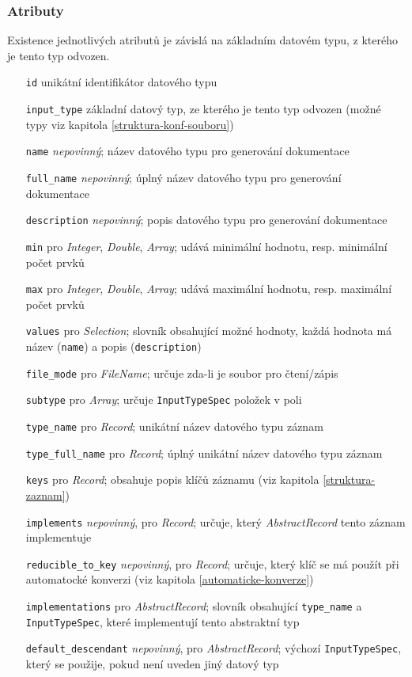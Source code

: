 \documentclass[FM,MP]{tulthesis}
\begin{document}
			\subsubsection{Atributy}
				Existence jednotlivých atributů je závislá na základním datovém typu, z kterého je tento typ odvozen.
				\begin{itemize}[leftmargin=4cm]
					\setlength\itemsep{-2mm}
					\item[\texttt{id}] unikátní identifikátor datového typu
					\item[\texttt{input\_type}] základní datový typ, ze kterého je tento typ odvozen (možné typy viz kapitola \ref{struktura-konf-souboru})
					\item[\texttt{name}] \textit{nepovinný}; název datového typu pro generování dokumentace
					\item[\texttt{full\_name}] \textit{nepovinný}; úplný název datového typu pro generování dokumentace
					\item[\texttt{description}] \textit{nepovinný}; popis datového typu pro generování dokumentace
					\item[\texttt{min}] pro \textit{Integer}, \textit{Double}, \textit{Array}; udává minimální hodnotu, resp. minimální počet prvků
					\item[\texttt{max}] pro \textit{Integer}, \textit{Double}, \textit{Array}; udává maximální hodnotu, resp. maximální počet prvků
					\item[\texttt{values}] pro \textit{Selection}; slovník obsahující možné hodnoty, každá hodnota má název (\texttt{name}) a popis (\texttt{description})
					\item[\texttt{file\_mode}] pro \textit{FileName}; určuje zda-li je soubor pro čtení/zápis
					\item[\texttt{subtype}] pro \textit{Array}; určuje \texttt{InputTypeSpec} položek v poli
					\item[\texttt{type\_name}] pro \textit{Record}; unikátní název datového typu záznam
					\item[\texttt{type\_full\_name}] pro \textit{Record}; úplný unikátní název datového typu záznam
					\item[\texttt{keys}] pro \textit{Record}; obsahuje popis klíčů záznamu (viz kapitola \ref{struktura-zaznam})
					\item[\texttt{implements}] \textit{nepovinný}, pro \textit{Record}; určuje, který \textit{AbstractRecord} tento záznam implementuje
					\item[\texttt{reducible\_to\_key}] \textit{nepovinný}, pro \textit{Record}; určuje, který klíč se má použít při automatocké konverzi (viz kapitola \ref{automaticke-konverze})
					\item[\texttt{implementations}] pro \textit{AbstractRecord}; slovník obsahující \texttt{type\_name} a \texttt{InputTypeSpec}, které implementují tento abstraktní typ
					\item[\texttt{default\_descendant}] \textit{nepovinný}, pro \textit{AbstractRecord}; výchozí \texttt{InputTypeSpec}, který se použije, pokud není uveden jiný datový typ
				\end{itemize}
\end{document}
